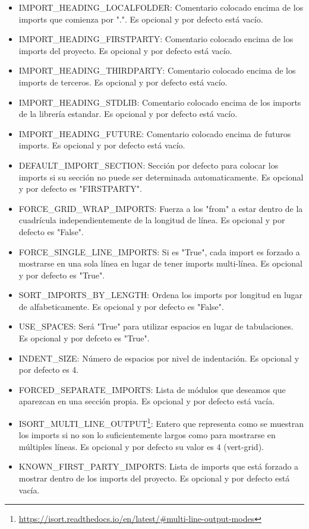 \documentclass[a4paper, 12pt]{book}
\begin{document}
\begin{itemize}
\begin{itemize}
          \item IMPORT\_HEADING\_LOCALFOLDER: Comentario colocado encima de los imports que comienza por ".". Es opcional y por defecto está vacío.
          \item IMPORT\_HEADING\_FIRSTPARTY: Comentario colocado encima de los imports del proyecto. Es opcional y por defecto está vacío.
          \item IMPORT\_HEADING\_THIRDPARTY: Comentario colocado encima de los imports de terceros. Es opcional y por defecto está vacío.
          \item IMPORT\_HEADING\_STDLIB: Comentario colocado encima de los imports de la librería estandar. Es opcional y por defecto está vacío.
          \item IMPORT\_HEADING\_FUTURE: Comentario colocado encima de futuros imports. Es opcional y por defecto está vacío.
          \item DEFAULT\_IMPORT\_SECTION: Sección por defecto para colocar los imports si su sección no puede ser determinada automaticamente. Es opcional y por defecto es "FIRSTPARTY".
          \item FORCE\_GRID\_WRAP\_IMPORTS: Fuerza a los "from" a estar dentro de la cuadrícula independientemente de la longitud de línea. Es opcional y por defecto es "False".
          \item FORCE\_SINGLE\_LINE\_IMPORTS: Si es "True", cada import es forzado a mostrarse en una sola línea en lugar de tener imports multi-línea. Es opcional y por defecto es "True".
          \item SORT\_IMPORTS\_BY\_LENGTH: Ordena los imports por longitud en lugar de alfabeticamente. Es opcional y por defecto es "False".
          \item USE\_SPACES: Será "True" para utilizar espacios en lugar de tabulaciones. Es opcional y por defceto es "True".
          \item INDENT\_SIZE: Número de espacios por nivel de indentación. Es opcional y por defecto es 4.
          \item FORCED\_SEPARATE\_IMPORTS: Lista de módulos que deseamos que aparezcan en una sección propia. Es opcional y por defecto está vacía.
          \item ISORT\_MULTI\_LINE\_OUTPUT\footnote{\url{https://isort.readthedocs.io/en/latest/#multi-line-output-modes}}: Entero que representa como se muestran los imports si no son lo suficientemente largos como para mostrarse en múltiples líneas. Es opcional y por defecto su valor es 4 (vert-grid).
          \item KNOWN\_FIRST\_PARTY\_IMPORTS: Lista de imports que está forzado a mostrar dentro de los imports del proyecto. Es opcional y por defecto está vacía.

\end{itemize}
\end{itemize}
\end{document}
